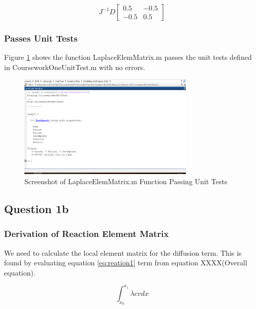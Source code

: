 \documentclass[11pt]{article}
\begin{document}
\begin{equation} \label{eq:diffmatrix}
J^{-1}D
\begin{bmatrix}

0.5 & -0.5 \\
-0.5 & 0.5
\end{bmatrix}
\end{equation}


\subsubsection{Passes Unit Tests}

Figure \ref{fig:passTest1} shows the function LaplaceElemMatrix.m passes the unit tests defined in CourseworkOneUnitTest.m with no errors.

\begin{figure}[h!]
	\centering
	\includegraphics[width=0.75\textwidth]{CW1Test.PNG}
	\caption{Screenshot of LaplaceElemMatrix.m Function Passing Unit Tests}\label{fig:passTest1}
\end{figure}



\subsection{Question 1b}
\subsubsection{Derivation of Reaction Element Matrix}

We need to calculate the local element matrix for the diffusion term. This is found by evaluating equation \ref{eq:reation1} term from equation XXXX(Overall equation).

\begin{equation} \label{eq:reation1}
\int_{x_{0}}^{x_{1}} \lambda c v  dx
\end{equation}
\end{document}
